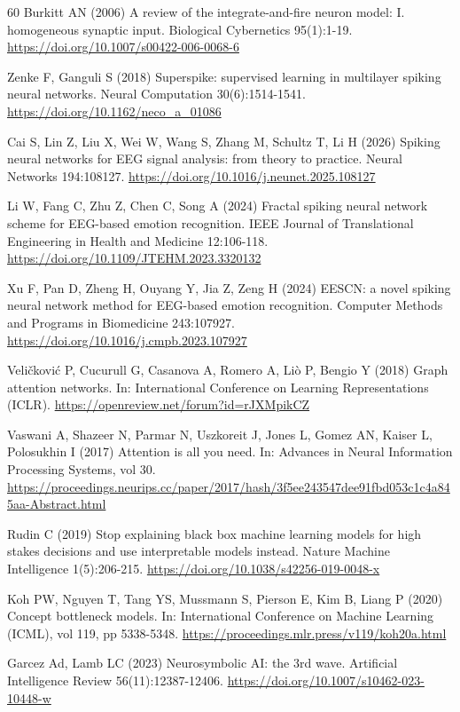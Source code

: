 \documentclass[pdflatex,sn-basic,Numbered,twocolumn,iicol]{sn-jnl}
\theoremstyle{thmstyleone}%
\theoremstyle{thmstyletwo}%
\theoremstyle{thmstylethree}%
\begin{document}
\begin{thebibliography}{60}
 Burkitt AN (2006) A review of the integrate-and-fire neuron model: I. homogeneous synaptic input. Biological Cybernetics 95(1):1-19. \url{https://doi.org/10.1007/s00422-006-0068-6}

 Zenke F, Ganguli S (2018) Superspike: supervised learning in multilayer spiking neural networks. Neural Computation 30(6):1514-1541. \url{https://doi.org/10.1162/neco_a_01086}

 Cai S, Lin Z, Liu X, Wei W, Wang S, Zhang M, Schultz T, Li H (2026) Spiking neural networks for EEG signal analysis: from theory to practice. Neural Networks 194:108127. \url{https://doi.org/10.1016/j.neunet.2025.108127}

 Li W, Fang C, Zhu Z, Chen C, Song A (2024) Fractal spiking neural network scheme for EEG-based emotion recognition. IEEE Journal of Translational Engineering in Health and Medicine 12:106-118. \url{https://doi.org/10.1109/JTEHM.2023.3320132}

 Xu F, Pan D, Zheng H, Ouyang Y, Jia Z, Zeng H (2024) EESCN: a novel spiking neural network method for EEG-based emotion recognition. Computer Methods and Programs in Biomedicine 243:107927. \url{https://doi.org/10.1016/j.cmpb.2023.107927}

 Veli\v{c}kovi\'c P, Cucurull G, Casanova A, Romero A, Li\`o P, Bengio Y (2018) Graph attention networks. In: International Conference on Learning Representations (ICLR). \url{https://openreview.net/forum?id=rJXMpikCZ}

 Vaswani A, Shazeer N, Parmar N, Uszkoreit J, Jones L, Gomez AN, Kaiser L, Polosukhin I (2017) Attention is all you need. In: Advances in Neural Information Processing Systems, vol 30. \url{https://proceedings.neurips.cc/paper/2017/hash/3f5ee243547dee91fbd053c1c4a845aa-Abstract.html}

 Rudin C (2019) Stop explaining black box machine learning models for high stakes decisions and use interpretable models instead. Nature Machine Intelligence 1(5):206-215. \url{https://doi.org/10.1038/s42256-019-0048-x}

 Koh PW, Nguyen T, Tang YS, Mussmann S, Pierson E, Kim B, Liang P (2020) Concept bottleneck models. In: International Conference on Machine Learning (ICML), vol 119, pp 5338-5348. \url{https://proceedings.mlr.press/v119/koh20a.html}

 Garcez Ad, Lamb LC (2023) Neurosymbolic AI: the 3rd wave. Artificial Intelligence Review 56(11):12387-12406. \url{https://doi.org/10.1007/s10462-023-10448-w}


\end{thebibliography}
\end{document}
